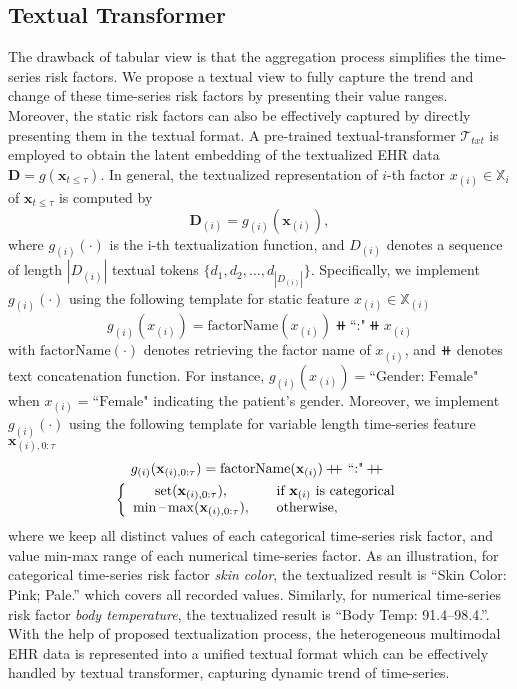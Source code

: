 \subsection{Textual Transformer}
The drawback of tabular view is that the aggregation process simplifies the time-series risk factors. We propose a textual view to fully capture the trend and change of these time-series risk factors by presenting their value ranges. Moreover, the static risk factors can also be effectively captured by directly presenting them in the textual format. A pre-trained textual-transformer $\mathcal{T}_{txt}$ is employed to obtain the latent embedding of the textualized EHR data $\mathbf{D}=g(\mathbf{x}_{t\leq \tau})$. 
In general, the textualized representation of $i$-th factor $x_{(i)} \in \mathbb{X}_i$ of $\mathbf{x}_{t\leq\tau}$ is computed by
\begin{equation}
\mathbf{D}_{(i)}=g_{(i)}(\mathbf{x}_{(i)}),
\end{equation}
where $g_{(i)}(\cdot)$ is the i-th textualization function, and $D_{(i)}$ denotes a sequence of length $|D_{(i)}|$ textual tokens $\{d_1,d_2,\dots,d_{|D_{(i)}|}\}$. 
Specifically, we implement $g_{(i)}(\cdot)$ using the following template for static feature $x_{(i)} \in \mathbb{X}_{(i)}$
\begin{equation}
g_{(i)}(x_{(i)})=\text{factorName}(x_{(i)})\doubleplus \text{``:"}\doubleplus x_{(i)}
\end{equation}
with $\text{factorName}(\cdot)$ denotes retrieving the factor name of $x_{(i)}$, and $\doubleplus$ denotes text concatenation function. For instance, $g_{(i)}(x_{(i)})=\text{``Gender: Female"}$ when $x_{(i)}=\text{``Female"}$ indicating the patient's gender.
Moreover, we implement $g_{(i)}(\cdot)$ using the following template for variable length time-series feature $\mathbf{x}_{(i),0:\tau}$  
\begin{multline}
g_{(i)}(\mathbf{x}_{(i),0:\tau})=\text{factorName}(\mathbf{x}_{(i)})+\kern-1.3ex+\kern0.8ex \text{``:"} +\kern-1.3ex+\kern0.8ex\\
\left\{
    \begin{array}{ c l }
    \textrm{set}(\mathbf{x}_{(i),0:\tau}), & \quad \textrm{if } \mathbf{x}_{(i)} \textrm{ is categorical}\\
    \min\text{--}\max(\mathbf{x}_{(i),0:\tau}), & \quad \textrm{otherwise},\\
    \end{array}
\right.\label{eq:ts_textual}
\end{multline}
where we keep all distinct values of each categorical time-series risk factor, and value min-max range of each numerical time-series factor. As an illustration, for categorical time-series risk factor \textit{skin color}, the textualized result is ``Skin Color: Pink; Pale.'' which covers all recorded values. Similarly, for numerical time-series risk factor \textit{body temperature}, the textualized result is ``Body Temp: 91.4--98.4.''. 
With the help of proposed textualization process, the heterogeneous multimodal EHR data is represented into a unified textual format which can be effectively handled by textual transformer, capturing dynamic trend of time-series. 

